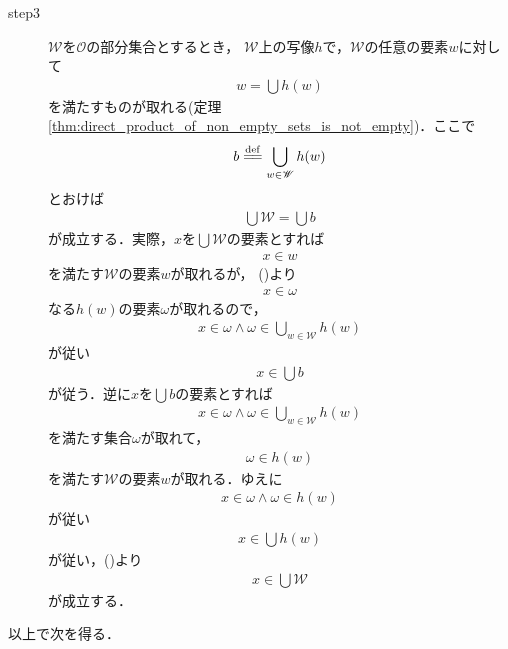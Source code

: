 \begin{description}
		\item[step3]
			$\mathscr{W}$を$\mathscr{O}$の部分集合とするとき，
			$\mathscr{W}$上の写像$h$で，$\mathscr{W}$の任意の要素$w$に対して
			\begin{align}
				w = \bigcup h(w)
				\label{fom:generation_of_topology_1}
			\end{align}
			を満たすものが取れる(定理\ref{thm:direct_product_of_non_empty_sets_is_not_empty})．ここで
			\begin{align}
				b \defeq \bigcup_{w \in \mathscr{W}} h(w)
			\end{align}
			とおけば
			\begin{align}
				\bigcup \mathscr{W} = \bigcup b
			\end{align}
			が成立する．実際，$x$を$\bigcup \mathscr{W}$の要素とすれば
			\begin{align}
				x \in w
			\end{align}
			を満たす$\mathscr{W}$の要素$w$が取れるが，
			()より
			\begin{align}
				x \in \omega
			\end{align}
			なる$h(w)$の要素$\omega$が取れるので，
			\begin{align}
				x \in \omega \wedge \omega \in \bigcup_{w \in \mathscr{W}} h(w)
			\end{align}
			が従い
			\begin{align}
				x \in \bigcup b
			\end{align}
			が従う．逆に$x$を$\bigcup b$の要素とすれば
			\begin{align}
				x \in \omega \wedge \omega \in \bigcup_{w \in \mathscr{W}} h(w)
			\end{align}
			を満たす集合$\omega$が取れて，
			\begin{align}
				\omega \in h(w)
			\end{align}
			を満たす$\mathscr{W}$の要素$w$が取れる．ゆえに
			\begin{align}
				x \in \omega \wedge \omega \in h(w)
			\end{align}
			が従い
			\begin{align}
				x \in \bigcup h(w)
			\end{align}
			が従い，()より
			\begin{align}
				x \in \bigcup \mathscr{W}
			\end{align}
			が成立する．
	\end{description}
	
	以上で次を得る．
	
